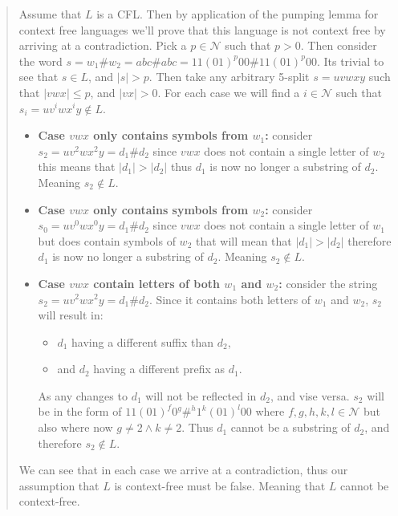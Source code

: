 \documentclass[a4paper]{article}
\begin{document}
        \begin{quote}
            Assume that $L$ is a CFL. Then by application of the pumping lemma for context free languages we'll prove that this language is not context free by arriving at a contradiction. Pick a $p\in\mathcal{N}$ such that $p > 0$. Then consider the word $s = w_1\#w_2 = abc\#abc = 11(01)^p00\#11(01)^p00$. Its trivial to see that $s\in L$, and $|s| > p$. Then take any arbitrary 5-split $s = uvwxy$ such that $|vwx| \leqslant p$, and $|vx| > 0$. For each case we will find a $i\in \mathcal{N}$ such that $s_i = uv^iwx^iy \not\in L$.
            \begin{itemize}
                \item \textbf{Case $vwx$ only contains symbols from $w_1$:} consider $s_2 = uv^2wx^2y = d_1\#d_2$ since $vwx$ does not contain a single letter of $w_2$ this means that $|d_1| > |d_2|$ thus $d_1$ is now no longer a substring of $d_2$. Meaning $s_2 \not\in L$.
                \item \textbf{Case $vwx$ only contains symbols from $w_2$:} consider $s_0 = uv^0wx^0y = d_1\#d_2$ since $vwx$ does not contain a single letter of $w_1$ but does contain symbols of $w_2$ that will mean that $|d_1| > |d_2|$ therefore $d_1$ is now no longer a substring of $d_2$. Meaning $s_2 \not\in L$.
                \item \textbf{Case $vwx$ contain letters of both $w_1$ and $w_2$:} consider the string $s_2 = uv^2wx^2y = d_1\#d_2$. Since it contains both letters of $w_1$ and $w_2$, $s_2$ will result in:
                \begin{itemize}
                    \item $d_1$ having a different suffix than $d_2$,
                    \item and $d_2$ having a different prefix as $d_1$.
                \end{itemize}
                As any changes to $d_1$ will not be reflected in $d_2$, and vise versa. $s_2$ will be in the form of $11(01)^f0^g\#^h1^k(01)^l00$ where $f, g, h, k, l \in\mathcal{N}$ but also where now $g\neq 2 \wedge k\neq2$. Thus $d_1$ cannot be a substring of $d_2$, and therefore $s_2\not\in L$.
            \end{itemize}
            We can see that in each case we arrive at a contradiction, thus our assumption that $L$ is context-free must be false. Meaning that $L$ cannot be context-free.
        \end{quote}
\end{document}
